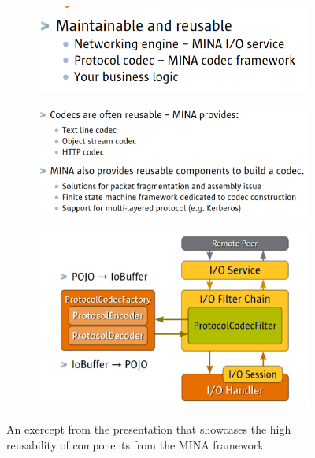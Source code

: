 \begin{figure}[H]
    \centering
    \begin{subfigure}[b]{0.7\textwidth}
         \centering
         \includegraphics[width=\textwidth]{images/reusable1.png}
     \end{subfigure}

     \begin{subfigure}[b]{0.7\textwidth}
         \centering
         \includegraphics[width=\textwidth]{images/reusable.png}
     \end{subfigure}
     
    \begin{subfigure}[b]{0.7\textwidth}
         \centering
         \includegraphics[width=\textwidth]{images/architecture_codec.png}
     \end{subfigure}
    
    \caption{An exercept from the presentation \cite{mina-talk2008} that showcases the high reusability  of components from the MINA framework.}
    \label{fig:reusability}
\end{figure}

